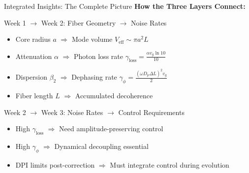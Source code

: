 \documentclass[aspectratio=169,12pt]{beamer}
\begin{document}
\begin{frame}{Integrated Insights: The Complete Picture}
\textbf{How the Three Layers Connect:}

\vspace{0.3cm}

\begin{block}{Week 1 $\to$ Week 2: Fiber Geometry $\to$ Noise Rates}
\begin{itemize}
\item Core radius $a$ $\Rightarrow$ Mode volume $V_{\text{eff}} \sim \pi a^2 L$
\item Attenuation $\alpha$ $\Rightarrow$ Photon loss rate $\gamma_{\text{loss}} = \frac{\alpha v_g \ln 10}{10}$
\item Dispersion $\beta_2$ $\Rightarrow$ Dephasing rate $\gamma_\phi = \frac{(\omega D_p \Delta L)^2 v_g}{2}$
\item Fiber length $L$ $\Rightarrow$ Accumulated decoherence
\end{itemize}
\end{block}

\vspace{0.3cm}

\begin{block}{Week 2 $\to$ Week 3: Noise Rates $\to$ Control Requirements}
\begin{itemize}
\item High $\gamma_{\text{loss}}$ $\Rightarrow$ Need amplitude-preserving control
\item High $\gamma_\phi$ $\Rightarrow$ Dynamical decoupling essential
\item DPI limits post-correction $\Rightarrow$ Must integrate control during evolution
\end{itemize}
\end{block}
\end{frame}
\end{document}
